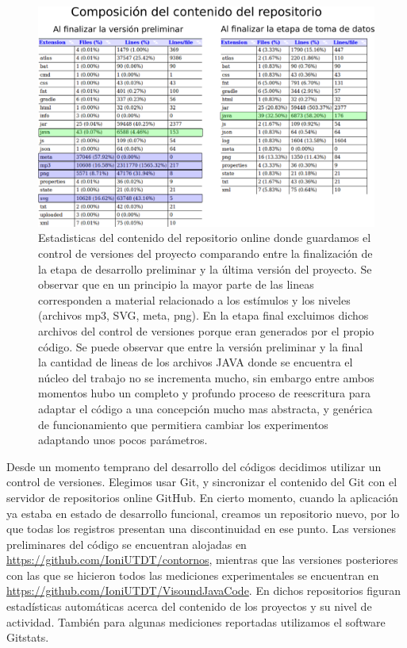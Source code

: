 \documentclass{article}
\begin{document}
    \begin{figure}
        \center
        \includegraphics[width=\textwidth]{Imagenes/Lineas.png}
        \caption{Estadisticas del contenido del repositorio online donde guardamos el control de versiones del proyecto comparando entre la finalización de la etapa de desarrollo preliminar y la última versión del proyecto. Se observar que en un principio la mayor parte de las lineas corresponden a material relacionado a los estímulos y los niveles (archivos mp3, SVG, meta, png). En la etapa final excluimos dichos archivos del control de versiones porque eran generados por el propio código. Se puede observar que entre la versión preliminar y la final la cantidad de lineas de los archivos JAVA donde se encuentra el núcleo del trabajo no se incrementa mucho, sin embargo entre ambos momentos hubo un completo y profundo proceso de reescritura para adaptar el código a una concepción mucho mas abstracta, y genérica de funcionamiento que permitiera cambiar los experimentos adaptando unos pocos parámetros.}
        \label{fig:Lineas}
    \end{figure}
        
    Desde un momento temprano del desarrollo del códigos decidimos utilizar un control de versiones. Elegimos usar Git, y sincronizar el contenido del Git con el servidor de repositorios online GitHub. En cierto momento, cuando la aplicación ya estaba en estado de desarrollo funcional, creamos un repositorio nuevo, por lo que todas los registros presentan una discontinuidad en ese punto. Las versiones preliminares del código se encuentran alojadas en \url{https://github.com/IoniUTDT/contornos}, mientras que las versiones posteriores con las que se hicieron todos las mediciones experimentales se encuentran en \url{https://github.com/IoniUTDT/VisoundJavaCode}. En dichos repositorios figuran estadísticas automáticas acerca del contenido de los proyectos y su nivel de actividad. También para algunas mediciones reportadas utilizamos el software Gitstats.
    
\end{document}
